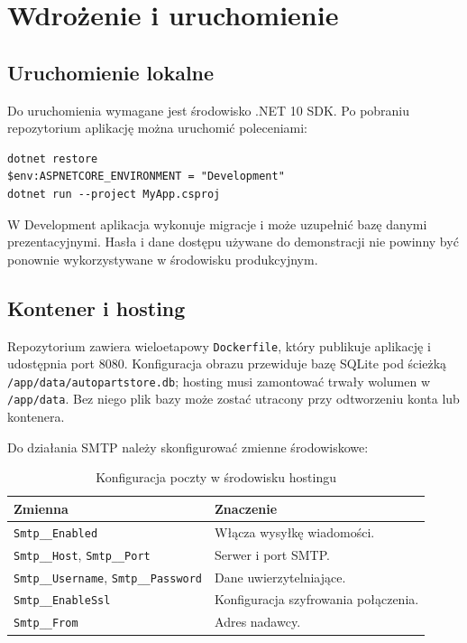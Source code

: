 \documentclass[12pt,a4paper]{article}
\begin{document}
\section{Wdrożenie i uruchomienie}

\subsection{Uruchomienie lokalne}
Do uruchomienia wymagane jest środowisko .NET 10 SDK. Po pobraniu repozytorium
aplikację można uruchomić poleceniami:

\begin{lstlisting}[caption={Przykładowe polecenia lokalnego uruchomienia}]
dotnet restore
$env:ASPNETCORE_ENVIRONMENT = "Development"
dotnet run --project MyApp.csproj
\end{lstlisting}

W Development aplikacja wykonuje migracje i może uzupełnić bazę danymi
prezentacyjnymi. Hasła i dane dostępu używane do demonstracji nie powinny być
ponownie wykorzystywane w środowisku produkcyjnym.

\subsection{Kontener i hosting}
Repozytorium zawiera wieloetapowy \texttt{Dockerfile}, który publikuje aplikację
i udostępnia port 8080. Konfiguracja obrazu przewiduje bazę SQLite pod ścieżką
\texttt{/app/data/autopartstore.db}; hosting musi zamontować trwały wolumen
w \texttt{/app/data}. Bez niego plik bazy może zostać utracony przy odtworzeniu
konta lub kontenera.

Do działania SMTP należy skonfigurować zmienne środowiskowe:
\begin{table}[H]
\centering
\small
\begin{tabularx}{\textwidth}{@{}l X@{}}
\toprule
\textbf{Zmienna} & \textbf{Znaczenie}\\
\midrule
\texttt{Smtp\_\_Enabled} & Włącza wysyłkę wiadomości.\\
\texttt{Smtp\_\_Host}, \texttt{Smtp\_\_Port} & Serwer i port SMTP.\\
\texttt{Smtp\_\_Username}, \texttt{Smtp\_\_Password} & Dane uwierzytelniające.\\
\texttt{Smtp\_\_EnableSsl} & Konfiguracja szyfrowania połączenia.\\
\texttt{Smtp\_\_From} & Adres nadawcy.\\
\bottomrule
\end{tabularx}
\caption{Konfiguracja poczty w środowisku hostingu}
\end{table}
\end{document}
